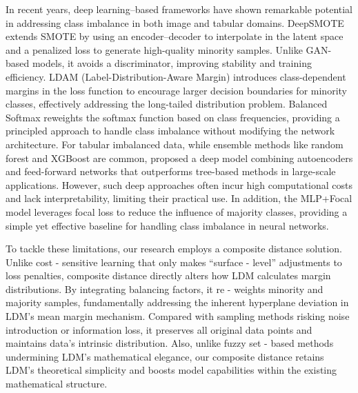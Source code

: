 \documentclass[a4paper]{cas-sc}
\begin{document}
{\color{orange}In recent years, deep learning–based frameworks have shown remarkable potential in addressing class imbalance in both image and tabular domains. DeepSMOTE \citep{dablain2022deepsmote} extends SMOTE by using an encoder–decoder to interpolate in the latent space and a penalized loss to generate high-quality minority samples. Unlike GAN-based models, it avoids a discriminator, improving stability and training efficiency. {\color{magenta}LDAM (Label-Distribution-Aware Margin) \citep{cao2019learning} introduces class-dependent margins in the loss function to encourage larger decision boundaries for minority classes, effectively addressing the long-tailed distribution problem. Balanced Softmax \citep{ren2020balanced} reweights the softmax function based on class frequencies, providing a principled approach to handle class imbalance without modifying the network architecture.} For tabular imbalanced data, while ensemble methods like random forest and XGBoost are common, \cite{farhang2024deep} proposed a deep model combining autoencoders and feed-forward networks that outperforms tree-based methods in large-scale applications. However, such deep approaches often incur high computational costs and lack interpretability, limiting their practical use. In addition, the MLP+Focal model \citep{lin2017focal} leverages focal loss to reduce the influence of majority classes, providing a simple yet effective baseline for handling class imbalance in neural networks.}

{\color{blue}
To tackle these limitations, our research employs a composite distance solution. Unlike cost - sensitive learning that only makes “surface - level” adjustments to loss penalties, composite distance directly alters how LDM calculates margin distributions. By integrating balancing factors, it re - weights minority and majority samples, fundamentally addressing the inherent hyperplane deviation in LDM’s mean margin mechanism. Compared with sampling methods risking noise introduction or information loss, it preserves all original data points and maintains data’s intrinsic distribution. Also, unlike fuzzy set - based methods undermining LDM’s mathematical elegance, our composite distance retains LDM’s theoretical simplicity and boosts model capabilities within the existing mathematical structure. }


\end{document}
